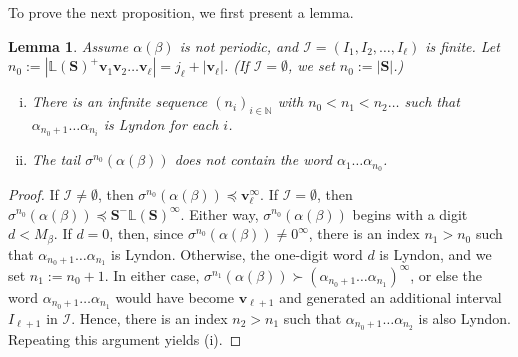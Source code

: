 \documentclass[11pt]{amsart}
\newtheorem{lemma}[theorem]{Lemma}
\theoremstyle{definition}
\theoremstyle{remark}
\numberwithin{equation}{section}
\newcommand{\N}{\ensuremath{\mathbb{N}}}
\renewcommand{\L}{\ensuremath{\mathbb{L}}}
\newcommand{\II}{\mathcal{I}}
\newcommand{\cs}{ {\mathbf{S}}}
\renewcommand{\v}{\mathbf{v}}
\newcommand{\f}{\infty}
\newcommand{\al}{\alpha}
\newcommand{\lle}{\preccurlyeq}
\newcommand{\si}{\sigma}
\begin{document}
{
To prove the next proposition, we first present a lemma.

\begin{lemma} \label{lem:it-does-not-come-back}
Assume $\al(\beta)$ is not periodic, and $\II=(I_1,I_2,\dots,I_{\ell})$ is finite. Let $n_0:=|\L(\cs)^+\v_1\v_2\dots\v_{\ell}|=j_{\ell}+|\v_{\ell}|$. (If $\II=\emptyset$, we set $n_0:=|\cs|$.)
\begin{enumerate}[(i)]
\item There is an infinite sequence $(n_i)_{i\in\N}$ with $n_0<n_1<n_2\dots$ such that $\al_{n_0+1}\dots\al_{n_i}$ is Lyndon for each $i$. %
\item The tail $\si^{n_0}(\al(\beta))$ does not contain the word $\al_1\dots\al_{n_0}$. 
\end{enumerate}
\end{lemma}

\begin{proof}
If $\II\neq\emptyset$, then $\si^{n_0}(\al(\beta))\lle\v_{\ell}^\f$. If $\II=\emptyset$, then $\si^{n_0}(\al(\beta))\lle \cs^-\L(\cs)^\f$. Either way, $\si^{n_0}(\al(\beta))$ begins with {a digit $d<M_\beta$. If $d=0$, then, since $\si^{n_0}(\al(\beta))\neq 0^\f$, there is an index $n_1>n_0$ such that $\al_{n_0+1}\dots\al_{n_1}$ is Lyndon. Otherwise, the one-digit word $d$ is Lyndon, and we set $n_1:=n_0+1$.
In either case,} $\si^{n_1}(\al(\beta))\succ (\al_{n_0+1}\dots\al_{n_1})^\f$, or else the word $\al_{n_0+1}\dots\al_{n_1}$ would have become $\v_{\ell+1}$ and generated an additional interval $I_{\ell+1}$ in $\II$. Hence, there is an index $n_2>n_1$ such that $\al_{n_0+1}\dots\al_{n_2}$ is also Lyndon. Repeating this argument yields (i).


\end{proof}}
\end{document}
